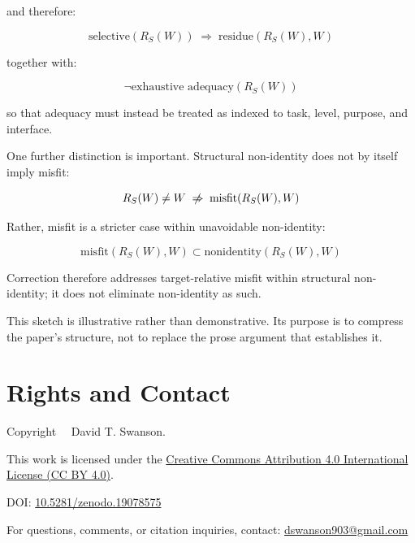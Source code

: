 \documentclass[11pt]{article}
\begin{document}
and therefore:

\[
\text{selective}(R_S(W)) \;\Rightarrow\; \text{residue}(R_S(W),W)
\]

together with:

\[
\neg \text{exhaustive adequacy}(R_S(W))
\]

so that adequacy must instead be treated as indexed to task, level, purpose, and interface.

One further distinction is important. Structural non-identity does not by itself imply misfit:

\[
R_S(W) \neq W \;\centernot\Rightarrow\; \text{misfit}(R_S(W),W)
\]

Rather, misfit is a stricter case within unavoidable non-identity:

\[
\text{misfit}(R_S(W),W) \subset \text{nonidentity}(R_S(W),W)
\]

Correction therefore addresses target-relative misfit within structural non-identity; it does not eliminate non-identity as such.

This sketch is illustrative rather than demonstrative. Its purpose is to compress the paper's structure, not to replace the prose argument that establishes it.



\section*{Rights and Contact}

\noindent
Copyright \textcopyright\ \the\year\ David T. Swanson.

\noindent
This work is licensed under the
\href{https://creativecommons.org/licenses/by/4.0/}
{Creative Commons Attribution 4.0 International License (CC BY 4.0)}.

\noindent
DOI:
\href{https://doi.org/10.5281/zenodo.19078575}{10.5281/zenodo.19078575}

\noindent
For questions, comments, or citation inquiries, contact:
\href{mailto:dswanson903@gmail.com}{dswanson903@gmail.com}
\end{document}
